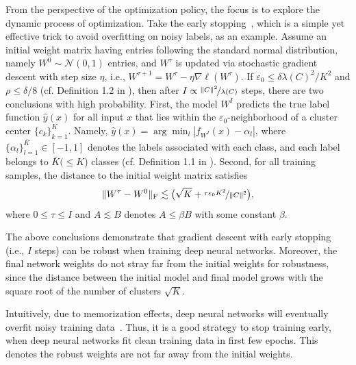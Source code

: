 From the perspective of the optimization policy,
the focus is to explore the dynamic process of optimization.
Take the early stopping~, 
which is a simple yet effective trick to avoid overfitting on noisy labels,
as an example. 
Assume an 
initial weight matrix having entries following the standard normal distribution, 
namely $W^0 \sim \mathcal{N}(0,1)$ entries, and $W^{\tau}$ is updated via stochastic gradient descent with step size $\eta$, 
i.e., $W^{\tau+1} = W^{\tau} - \eta \nabla \ell(W^{\tau})$. If $\varepsilon_0 \leq \delta\lambda(C)^2/K^2$ and $\rho \leq \delta/8$ (cf. Definition 1.2 in ), 
then after $I \propto \nicefrac{\lVert C \rVert^2}{\lambda(C)}$ steps, there are two conclusions  with high probability. First, the model $W^I$ predicts the true label function $\hat{y}(x)$ for all input $x$ that lies within the $\varepsilon_0$-neighborhood of a cluster center $\{c_k\}_{k=1}^K$.
Namely, $ \hat{y}(x) = \arg\min_{l}|f_{W^I}(x) - \alpha_l|$, 
where $\{\alpha_l\}_{l=1}^{\bar{K}}\in[-1,1]$ denotes the labels associated with each class, and each label belongs to $\bar{K} (\leq K$) classes (cf. Definition 1.1 in ). Second, for all training samples, the distance to the initial weight matrix satisfies
\begin{equation*}
\lVert W^{\tau} - W^0 \rVert_\mathrm{F} \lesssim \big(\sqrt{K} + \nicefrac{\tau \varepsilon_0 K^2}{\lVert C \rVert^2} \big),
\end{equation*}
where $0 \leq \tau \leq I$ and $A \lesssim B$ denotes $A \leq \beta B$ with some constant $\beta$. 
\begin{remark}
The above conclusions demonstrate that gradient descent with early stopping (i.e., $I$ steps) 
can be robust when training deep neural networks. 
Moreover, the final network weights do not stray far from the initial weights for robustness, 
since the distance between the initial model and final model grows with the square root of the number of clusters $\sqrt{K}$.
\end{remark}
Intuitively, due to memorization effects, deep neural networks will eventually overfit noisy training data~. Thus, it is a good strategy to stop training early, when deep neural networks fit clean training data in first few epochs. This denotes the robust weights are not far away from the initial weights.

